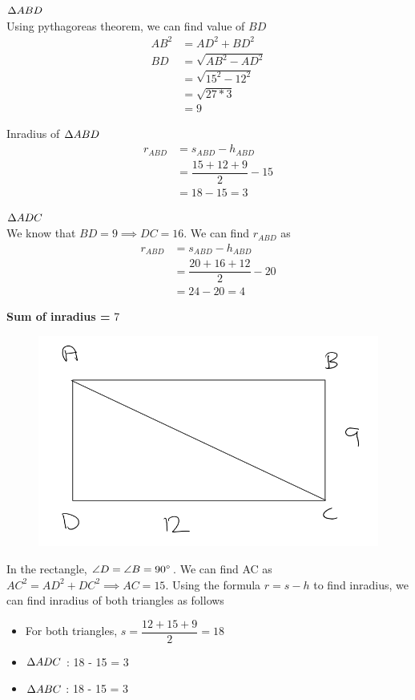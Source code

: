 \vspace{1cm}

$\Delta {ABD}$ \\
Using pythagoreas theorem, we can find value of $BD$ 
\begin{align*}
    AB^2 &= AD^2 + BD^2 \\ 
    BD &= \sqrt{AB^2 - AD^2} \\
    &= \sqrt{15^2 - 12^2} \\
    &= \sqrt{27 * 3} \\
    &= 9
\end{align*}

Inradius of $\Delta {ABD}$
\begin{align*}
    r_{ABD} &= s_{ABD} - h_{ABD} \\
    &= \dfrac{15 + 12 + 9}{2} - 15 \\
    &= 18 - 15 = 3
\end{align*}

\vspace{1cm}

$\Delta {ADC}$ \\
We know that $BD = 9 \implies DC = 16$. We can find $r_{ABD}$ as 
\begin{align*}
    r_{ABD} &= s_{ABD} - h_{ABD} \\
    &= \dfrac{20 + 16 + 12}{2} - 20 \\
    &= 24 - 20 = 4
\end{align*}

\textbf{Sum of inradius = } 7


\newpage


\begin{figure}[h!]
    \centering
    \includegraphics[width=0.5\linewidth]{Quant//Geometry//Images//Triangles/rodha_triangle_5_q2_1.png}
\end{figure}

In the rectangle, $\angle{D} = \angle{B} = {90}^{\circ}$. We can find AC as $AC^2 = AD^2 + DC^2 \implies AC = 15$. Using the formula $r = s - h$ to find inradius, we can find inradius of both triangles as follows
\begin{itemize}
    \item For both triangles, $s = \dfrac{12 + 15 + 9}{2} = 18$
    \item $\Delta {ADC}$ : 18 - 15 = 3
    \item $\Delta {ABC}$ : 18 - 15 = 3
\end{itemize}


